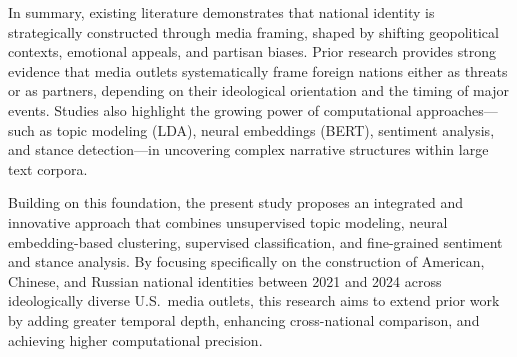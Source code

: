 \documentclass[12pt]{article}
\begin{document}
In summary, existing literature demonstrates that national identity is strategically constructed through media framing, shaped by shifting geopolitical contexts, emotional appeals, and partisan biases. Prior research provides strong evidence that media outlets systematically frame foreign nations either as threats or as partners, depending on their ideological orientation and the timing of major events. Studies also highlight the growing power of computational approaches—such as topic modeling (LDA), neural embeddings (BERT), sentiment analysis, and stance detection—in uncovering complex narrative structures within large text corpora.

Building on this foundation, the present study proposes an integrated and innovative approach that combines unsupervised topic modeling, neural embedding-based clustering, supervised classification, and fine-grained sentiment and stance analysis. By focusing specifically on the construction of American, Chinese, and Russian national identities between 2021 and 2024 across ideologically diverse U.S.\ media outlets, this research aims to extend prior work by adding greater temporal depth, enhancing cross-national comparison, and achieving higher computational precision.
\end{document}
